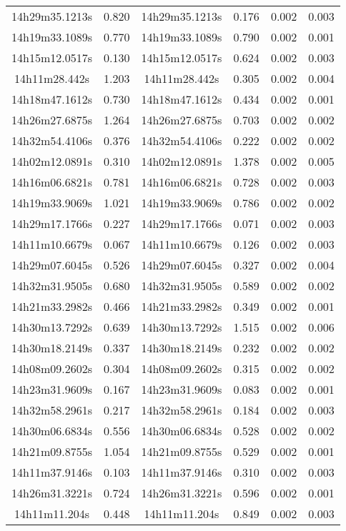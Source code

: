 \begin{table}
\begin{tabular}{cccccc}
14h29m35.1213s & 0.820 & 14h29m35.1213s & 0.176 & 0.002 & 0.003 \\
14h19m33.1089s & 0.770 & 14h19m33.1089s & 0.790 & 0.002 & 0.001 \\
14h15m12.0517s & 0.130 & 14h15m12.0517s & 0.624 & 0.002 & 0.003 \\
14h11m28.442s & 1.203 & 14h11m28.442s & 0.305 & 0.002 & 0.004 \\
14h18m47.1612s & 0.730 & 14h18m47.1612s & 0.434 & 0.002 & 0.001 \\
14h26m27.6875s & 1.264 & 14h26m27.6875s & 0.703 & 0.002 & 0.002 \\
14h32m54.4106s & 0.376 & 14h32m54.4106s & 0.222 & 0.002 & 0.002 \\
14h02m12.0891s & 0.310 & 14h02m12.0891s & 1.378 & 0.002 & 0.005 \\
14h16m06.6821s & 0.781 & 14h16m06.6821s & 0.728 & 0.002 & 0.003 \\
14h19m33.9069s & 1.021 & 14h19m33.9069s & 0.786 & 0.002 & 0.002 \\
14h29m17.1766s & 0.227 & 14h29m17.1766s & 0.071 & 0.002 & 0.003 \\
14h11m10.6679s & 0.067 & 14h11m10.6679s & 0.126 & 0.002 & 0.003 \\
14h29m07.6045s & 0.526 & 14h29m07.6045s & 0.327 & 0.002 & 0.004 \\
14h32m31.9505s & 0.680 & 14h32m31.9505s & 0.589 & 0.002 & 0.002 \\
14h21m33.2982s & 0.466 & 14h21m33.2982s & 0.349 & 0.002 & 0.001 \\
14h30m13.7292s & 0.639 & 14h30m13.7292s & 1.515 & 0.002 & 0.006 \\
14h30m18.2149s & 0.337 & 14h30m18.2149s & 0.232 & 0.002 & 0.002 \\
14h08m09.2602s & 0.304 & 14h08m09.2602s & 0.315 & 0.002 & 0.002 \\
14h23m31.9609s & 0.167 & 14h23m31.9609s & 0.083 & 0.002 & 0.001 \\
14h32m58.2961s & 0.217 & 14h32m58.2961s & 0.184 & 0.002 & 0.003 \\
14h30m06.6834s & 0.556 & 14h30m06.6834s & 0.528 & 0.002 & 0.002 \\
14h21m09.8755s & 1.054 & 14h21m09.8755s & 0.529 & 0.002 & 0.001 \\
14h11m37.9146s & 0.103 & 14h11m37.9146s & 0.310 & 0.002 & 0.003 \\
14h26m31.3221s & 0.724 & 14h26m31.3221s & 0.596 & 0.002 & 0.001 \\
14h11m11.204s & 0.448 & 14h11m11.204s & 0.849 & 0.002 & 0.003 \\

\end{tabular}
\end{table}
